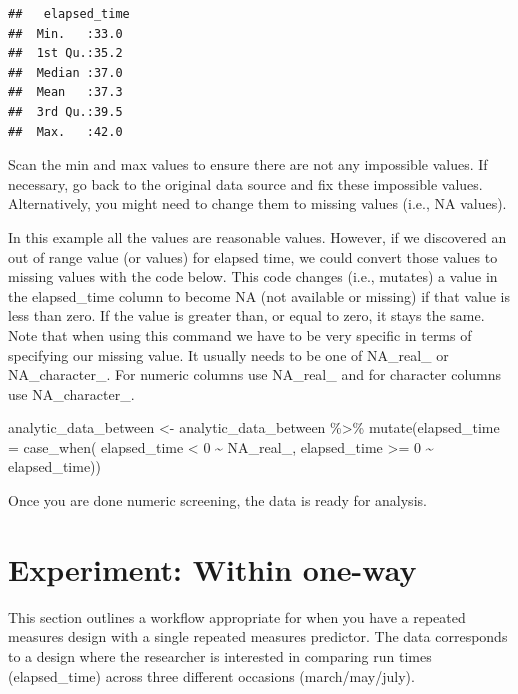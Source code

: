 \documentclass[
]{krantz}
\makeatletter
\newenvironment{Shaded}{\begin{snugshade}}{\end{snugshade}}
\newcommand{\AttributeTok}[1]{\textcolor[rgb]{0.61,0.61,0.61}{#1}}
\newcommand{\ConstantTok}[1]{\textcolor[rgb]{0,0,0}{#1}}
\newcommand{\DecValTok}[1]{\textcolor[rgb]{0.06,0.06,0.06}{#1}}
\newcommand{\FunctionTok}[1]{\textcolor[rgb]{0,0,0}{#1}}
\newcommand{\NormalTok}[1]{#1}
\newcommand{\OtherTok}[1]{\textcolor[rgb]{0.37,0.37,0.37}{#1}}
\newcommand{\SpecialCharTok}[1]{\textcolor[rgb]{0,0,0}{#1}}
\newenvironment{kframe}{%
\medskip{}
\setlength{\fboxsep}{.8em}
 \def\at@end@of@kframe{}%
 \ifinner\ifhmode%
  \def\at@end@of@kframe{\end{minipage}}%
  \begin{minipage}{\columnwidth}%
 \fi\fi%
 \def\FrameCommand##1{\hskip\@totalleftmargin \hskip-\fboxsep
 \colorbox{shadecolor}{##1}\hskip-\fboxsep
     \hskip-\linewidth \hskip-\@totalleftmargin \hskip\columnwidth}%
 \MakeFramed {\advance\hsize-\width
   \@totalleftmargin\z@ \linewidth\hsize
   \@setminipage}}%
 {\par\unskip\endMakeFramed%
 \at@end@of@kframe}
\renewenvironment{Shaded}{\begin{kframe}}{\end{kframe}}
\makeatother
\begin{document}
\begin{verbatim}
##   elapsed_time 
##  Min.   :33.0  
##  1st Qu.:35.2  
##  Median :37.0  
##  Mean   :37.3  
##  3rd Qu.:39.5  
##  Max.   :42.0
\end{verbatim}

Scan the min and max values to ensure there are not any impossible values. If necessary, go back to the original data source and fix these impossible values. Alternatively, you might need to change them to missing values (i.e., NA values).

In this example all the values are reasonable values. However, if we discovered an out of range value (or values) for elapsed time, we could convert those values to missing values with the code below. This code changes (i.e., mutates) a value in the elapsed\_time column to become NA (not available or missing) if that value is less than zero. If the value is greater than, or equal to zero, it stays the same. Note that when using this command we have to be very specific in terms of specifying our missing value. It usually needs to be one of NA\_real\_ or NA\_character\_. For numeric columns use NA\_real\_ and for character columns use NA\_character\_.

\begin{Shaded}
\begin{Highlighting}[]
\NormalTok{analytic\_data\_between }\OtherTok{\textless{}{-}}\NormalTok{ analytic\_data\_between  }\SpecialCharTok{\%\textgreater{}\%} 
    \FunctionTok{mutate}\NormalTok{(}\AttributeTok{elapsed\_time =} \FunctionTok{case\_when}\NormalTok{(}
\NormalTok{      elapsed\_time }\SpecialCharTok{\textless{}} \DecValTok{0} \SpecialCharTok{\textasciitilde{}} \ConstantTok{NA\_real\_}\NormalTok{,}
\NormalTok{      elapsed\_time }\SpecialCharTok{\textgreater{}=} \DecValTok{0} \SpecialCharTok{\textasciitilde{}}\NormalTok{ elapsed\_time))}
\end{Highlighting}
\end{Shaded}

Once you are done numeric screening, the data is ready for analysis.

\hypertarget{experiment-within-one-way}{%
\section{Experiment: Within one-way}\label{experiment-within-one-way}}

This section outlines a workflow appropriate for when you have a repeated measures design with a single repeated measures predictor. The data corresponds to a design where the researcher is interested in comparing run times (elapsed\_time) across three different occasions (march/may/july).
\end{document}
